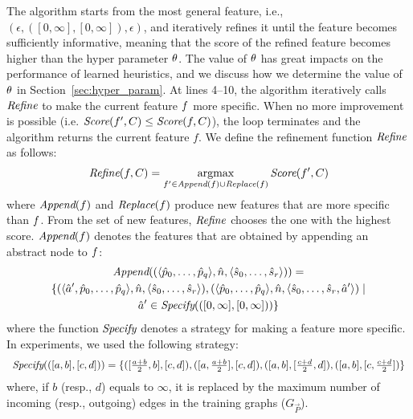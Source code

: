 The algorithm starts from the most general feature, i.e., $(\epsilon,([0,\infty],[0,\infty]),\epsilon)$, and
iteratively refines it until the feature becomes sufficiently informative, meaning that the score of the refined feature becomes higher than the hyper parameter ${\theta}$.
The value of ${\theta}$ has great impacts on the performance of learned heuristics, and
we discuss how we determine the value of ${\theta}$ in Section~\ref{sec:hyper_param}.
At lines 4--10, the algorithm iteratively calls ${\textit{Refine}}$ to make the current feature $f$ more specific.
When no more improvement is possible (i.e. ${\textit{Score}}(f', C) \le {\textit{Score}}(f,C)$), the loop terminates and the algorithm returns the current feature $f$.
We define the refinement function ${\textit{Refine}}$ as follows:
\[
\Refine(\feature,C) =
\argmax_{f' \in \Append(f) \cup \Replace(f)}
\Score(\feature',C)
\]
where ${\textit{Append}}(f)$ and ${\textit{Replace}}(f)$ produce new features that are more specific than $f$.
From the set of new features, ${\textit{Refine}}$ chooses the one with the highest score.
${\textit{Append}}(f)$ denotes the features that are obtained by appending an abstract node to $f$:
\begin{multline*}
	{\textit{Append}}((\langle {\hat{p}}_0,\dots,{\hat{p}}_q \rangle, {\hat{n}}, \langle {\hat{s}}_0,\dots,{\hat{s}}_r \rangle)) =\\
	\{ (\langle {\hat{a}}', {\hat{p}}_0,\dots,{\hat{p}}_q \rangle, {\hat{n}}, \langle {\hat{s}}_0,\dots,{\hat{s}}_r \rangle), (\langle {\hat{p}}_0,\dots,{\hat{p}}_q \rangle, {\hat{n}}, \langle {\hat{s}}_0,\dots,{\hat{s}}_r,{\hat{a}}' \rangle) \mid\\ {\hat{a}}' \in {\textit{Specify}}(([0,\infty],[0,\infty]))  \}
\end{multline*}
where the function ${\textit{Specify}}$ denotes a strategy for making a feature more specific.
In experiments, we used the following strategy:
\[
\begin{array}{l}
{\textit{Specify}}(([a,b],[c,d])) =
\{ 
([\frac{a+b}{2},b],[c,d]),
([a,\frac{a+b}{2}],[c,d]),
([a,b],[\frac{c+d}{2},d]),
([a,b],[c,\frac{c+d}{2}])
 \}
\end{array}
\]
where, if $b$ (resp., $d$) equals to $\infty$, it is replaced by the maximum number of incoming (resp., outgoing) edges in the training graphs ($G_\vec{P}$).

